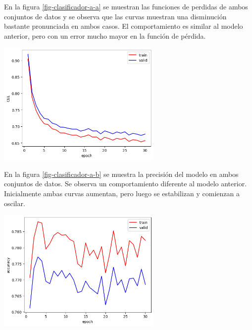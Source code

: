 \documentclass[aps,prl,reprint,groupedaddress]{revtex4-2}
\newenvironment{Figura}
  {\par\medskip\noindent\minipage{\linewidth}}
  {\endminipage\par\medskip}
\begin{document}
En la figura \ref{fig-clasificador-a-a} se muestran las funciones de perdidas 
de ambos conjuntos de datos y se observa que las curvas muestran una disminución
bastante pronunciada en ambos casos. El comportamiento es similar al modelo
anterior, pero con un error mucho mayor en la función de pérdida.
\begin{Figura}
  \centering
  \includegraphics[width=0.60\textwidth]{figs1/modelo_original_entrenando_solo_clasificadora_a.png}
  \label{fig-clasificador-a-a}
\end{Figura}

En la figura \ref{fig-clasificador-a-b} se muestra la precisión del modelo en
ambos conjuntos de datos. Se observa un comportamiento diferente al modelo 
anterior. Inicialmente ambas curvas aumentan, pero luego se estabilizan y 
comienzan a oscilar.
\begin{Figura}
  \centering
  \includegraphics[width=0.60\textwidth]{figs1/modelo_original_entrenando_solo_clasificadora_b.png}
  \label{fig-clasificador-a-b}
\end{Figura}
\end{document}
